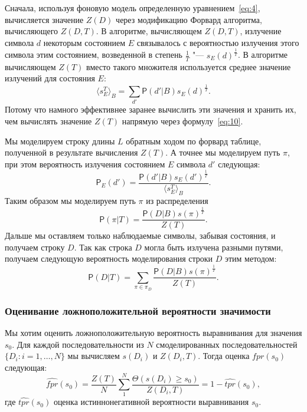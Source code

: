 \documentclass[specialist,
substylefile = spbu_report.rtx,
subf,href,colorlinks=true, 12pt]{disser}
\begin{document}
			Сначала, используя фоновую модель определенную уравнением~\eqref{eq:4}, вычисляется значение $Z(D)$ через модификацию Форвард алгоритма, вычисляющего $Z(D,T)$. В алгоритме, вычисляющем $Z(D,T)$, излучение символа $d$ некоторым состоянием $E$ связывалось с вероятностью излучения этого символа этим состоянием, возведенной в степень $\frac{1}{T}$ "--- $s_{E}(d)^{\frac{1}{T}}$. В алгоритме вычисляющем $Z(T)$ вместо такого множителя используется среднее значение излучений для состояния $E$:
			\begin{equation*}
				\langle s_{E}^{T} \rangle_{B} = \sum_{d'}\mathsf{P}(d'|B)s_{E}(d)^{\frac{1}{T}}. \label{eq:12}
			\end{equation*}					
			Потому что намного эффективнее заранее вычислить эти значения и хранить их, чем вычислять значение $Z(T)$ напрямую через формулу~\eqref{eq:10}.
			
			Мы моделируем строку длины $L$ обратным ходом по форвард таблице, полученной в результате вычисления $Z(T)$. А точнее мы моделируем путь $\pi$, при этом вероятность излучения состоянием $E$ символа $d'$ следующая:
			\begin{equation*}
				\mathsf{P}_{E}(d') = \frac{\mathsf{P}(d'|B)s_{E}(d')^{\frac{1}{T}}} {\langle s_{E}^{T} \rangle_{B}}. \label{eq:13}
			\end{equation*}			
			Таким образом мы моделируем путь $\pi$ из распределения 
			\begin{equation*}
				\mathsf{P}(\pi|T) = \frac{\mathsf{P}(D|B)s(\pi)^{\frac{1}{T}}}{Z(T)}. \label{eq:14}
			\end{equation*}
			Дальше мы оставляем только наблюдаемые символы, забывая состояния, и получаем строку $D$. Так как строка $D$ могла быть излучена разными путями, получаем следующую вероятность моделирования строки $D$ этим методом:
			\begin{equation*}				
				\mathsf{P}(D|T) = \sum_{\pi \in \pi_{D}} \frac{\mathsf{P}(D|B)s(\pi)^{\frac{1}{T}}}{Z(T)}. \label{eq:15}
			\end{equation*}	
			
			\subsubsection{Оценивание ложноположительной вероятности значимости}			
			Мы хотим оценить ложноположительную вероятность выравнивания для значения $s_{0}$. Для каждой последовательности из $N$ смоделированных последовательностей $\{D_{i}:i=1,\dots,N\}$ мы вычисляем $s(D_{i})$ и $Z(D_{i}, T)$. Тогда оценка $fpr(s_{0})$ следующая:
			\begin{equation*}	
				\widehat{fpr}(s_{0}) = \frac{Z(T)}{N} \sum_{1}^{N} \frac{\Theta(s(D_{i}) \geq s_{0})}{Z(D_{i}, T)} = 1-\widehat{tpr}(s_{0}), \label{eq:16}
			\end{equation*}				
			где $\widehat{tpr}(s_{0})$ оценка истиннонегативной вероятности выравнивания $s_{0}$.
			
\end{document}
